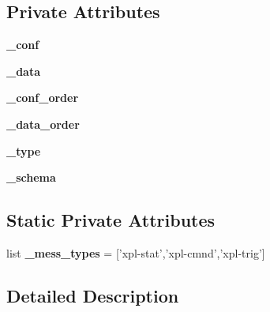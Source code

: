 \subsection*{Private Attributes}
\begin{CompactItemize}
\item 
\hypertarget{classxPLAPI_1_1Message_24328ca4d71be4d24f67d043d1c58f54}{
\textbf{\_\-conf}}
\label{classxPLAPI_1_1Message_24328ca4d71be4d24f67d043d1c58f54}

\item 
\hypertarget{classxPLAPI_1_1Message_29972dfac0cce8db6bd4a6a88adbe817}{
\textbf{\_\-data}}
\label{classxPLAPI_1_1Message_29972dfac0cce8db6bd4a6a88adbe817}

\item 
\hypertarget{classxPLAPI_1_1Message_88e4d23012224e9a9fa6ace6357016cb}{
\textbf{\_\-conf\_\-order}}
\label{classxPLAPI_1_1Message_88e4d23012224e9a9fa6ace6357016cb}

\item 
\hypertarget{classxPLAPI_1_1Message_9b6bd7b6c391434890d4ba996c3cda37}{
\textbf{\_\-data\_\-order}}
\label{classxPLAPI_1_1Message_9b6bd7b6c391434890d4ba996c3cda37}

\item 
\hypertarget{classxPLAPI_1_1Message_d4c56a71254ebbfc52582819bdc0c2d7}{
\textbf{\_\-type}}
\label{classxPLAPI_1_1Message_d4c56a71254ebbfc52582819bdc0c2d7}

\item 
\hypertarget{classxPLAPI_1_1Message_0f504647b076c8e1d4330941ee30f66f}{
\textbf{\_\-schema}}
\label{classxPLAPI_1_1Message_0f504647b076c8e1d4330941ee30f66f}

\end{CompactItemize}
\subsection*{Static Private Attributes}
\begin{CompactItemize}
\item 
\hypertarget{classxPLAPI_1_1Message_cd58199e9068e7351ac49b73675311f5}{
list \textbf{\_\-mess\_\-types} = \mbox{[}'xpl-stat','xpl-cmnd','xpl-trig'\mbox{]}}
\label{classxPLAPI_1_1Message_cd58199e9068e7351ac49b73675311f5}

\end{CompactItemize}


\subsection{Detailed Description}


